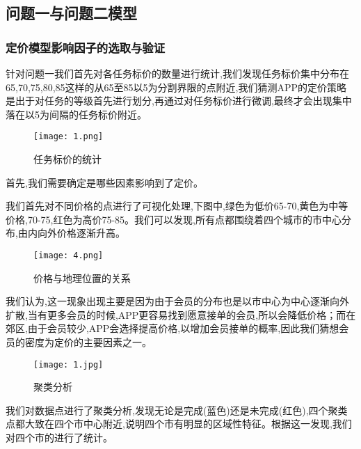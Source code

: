 \documentclass{cumcmthesis}
\begin{document}
\subsection{问题一与问题二模型}
\subsubsection{定价模型影响因子的选取与验证}
针对问题一我们首先对各任务标价的数量进行统计,我们发现任务标价集中分布在65,70,75,80,85这样的从65至85以5为分割界限的点附近,我们猜测APP的定价策略是出于对任务的等级首先进行划分,再通过对任务标价进行微调,最终才会出现集中落在以5为间隔的任务标价附近。
\begin{figure}[!htp]
	\centering
	\texttt{[image: 1.png]}
	\caption{任务标价的统计}\label{Fig:1}
\end{figure}

首先,我们需要确定是哪些因素影响到了定价。

我们首先对不同价格的点进行了可视化处理,下图中,绿色为低价65-70,黄色为中等价格,70-75,红色为高价75-85。我们可以发现,所有点都围绕着四个城市的市中心分布,由内向外价格逐渐升高。

\begin{figure}[!htp]
	\centering
	\texttt{[image: 4.png]}
	\caption{价格与地理位置的关系}\label{Fig:2}
\end{figure}


我们认为,这一现象出现主要是因为由于会员的分布也是以市中心为中心逐渐向外扩散,当有更多会员的时候,APP更容易找到愿意接单的会员,所以会降低价格；而在郊区,由于会员较少,APP会选择提高价格,以增加会员接单的概率,因此我们猜想会员的密度为定价的主要因素之一。

\begin{figure}[!htp]
	\centering
	\texttt{[image: 1.jpg]}
	\caption{聚类分析}\label{Fig:3}
\end{figure}


我们对数据点进行了聚类分析,发现无论是完成(蓝色)还是未完成(红色),四个聚类点都大致在四个市中心附近,说明四个市有明显的区域性特征。根据这一发现,我们对四个市的进行了统计。
\end{document}
